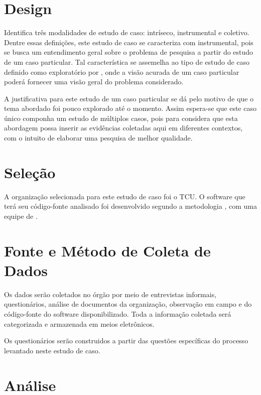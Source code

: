 \section{Design}\label{sec:Design}

 Identifica três modalidades de estudo de caso: intríseco, instrumental e coletivo. Dentre essas definições, este estudo de caso se caracteriza com instrumental, pois se busca um entendimento geral sobre o problema de pesquisa a partir do estudo de um caso particular. Tal característica se assemelha ao tipo de estudo de caso definido como exploratório por , onde a visão acurada de um caso particular poderá fornecer uma visão geral do problema considerado.

A justificativa para este estudo de um caso particular se dá pelo motivo de que o tema abordado foi pouco explorado até o momento. Assim espera-se que este caso único componha um estudo de múltiplos casos, pois para  considera que esta abordagem possa inserir as evidências coletadas aqui em diferentes contextos, com o intuito de elaborar uma pesquisa de melhor qualidade.



\section{Seleção}\label{sec:Seleção}

A organização selecionada para este estudo de caso foi o 
TCU.
O software que terá seu código-fonte analisado foi desenvolvido segundo a metodologia
, com uma equipe de 
.

\section{Fonte e Método de Coleta de Dados}\label{sec:Fonte e Método de Coleta de Dados}

Os dados serão coletados no órgão por meio de entrevistas informais, questionários, análise de documentos da organização, observação em campo e do código-fonte do software disponibilizado.
Toda a informação coletada será categorizada e armazenada em meios eletrônicos.

Os questionários serão construidos a partir das questões específicas do processo levantado neste estudo de caso.


\section{Análise}\label{sec:Análise}

